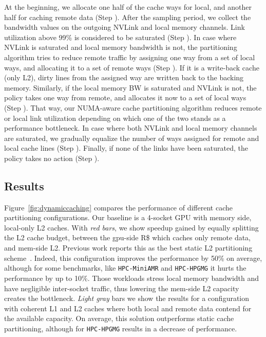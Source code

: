 At the beginning, we allocate one half of the cache ways for local, and 
another half for caching remote data (Step ). After the sampling 
period, we collect the bandwidth values on the outgoing NVLink and local 
memory channels. Link utilization above 99\% is considered to be saturated 
(Step ). In case where NVLink is saturated and local memory 
bandwidth is not, the partitioning algorithm tries to reduce remote traffic 
by assigning one way from a set of local ways, and allocating it to a set of 
remote ways (Step ). If it is a write-back cache (only L2), dirty 
lines from the assigned way are written back to the backing memory. 
Similarly, if the local memory BW is saturated and NVLink is not, the policy 
takes one way from remote, and allocates it now to a set of local ways (Step 
). That way, our NUMA-aware cache partitioning algorithm reduces 
remote or local link utilization depending on which one of the two stands as 
a performance bottleneck. In case where both NVLink and local memory channels 
are saturated, we gradually equalize the number of ways assigned for remote 
and local cache lines (Step ). Finally, if none of the links have 
been saturated, the policy takes no action (Step ).


\subsection{Results}

Figure~\ref{fig:dynamiccaching} compares the performance of different cache 
partitioning configurations. Our baseline is a 4-socket GPU with memory side, 
local-only L2 caches. With \emph{red bars}, we show speedup gained by equally 
splitting the L2 cache budget, between the gpu-side R\$ which caches only 
remote data, and mem-side L2. Previous work reports this as the best static 
L2 partitioning scheme~\cite{Arunkumar2017}. Indeed, this configuration 
improves the performance by 50\% on average, although for some benchmarks, 
like \texttt{HPC-MiniAMR} and \texttt{HPC-HPGMG} it hurts the performance by 
up to 10\%. Those workloads stress local memory bandwidth and have negligible 
inter-socket traffic, thus lowering the mem-side L2 capacity creates the 
bottleneck. \emph{Light gray} bars we show the results for a configuration with 
coherent L1 and L2 caches where both local and remote data contend for the 
available capacity. On average, this solution outperforms static cache 
partitioning, although for \texttt{HPC-HPGMG} results in a decrease of 
performance.

